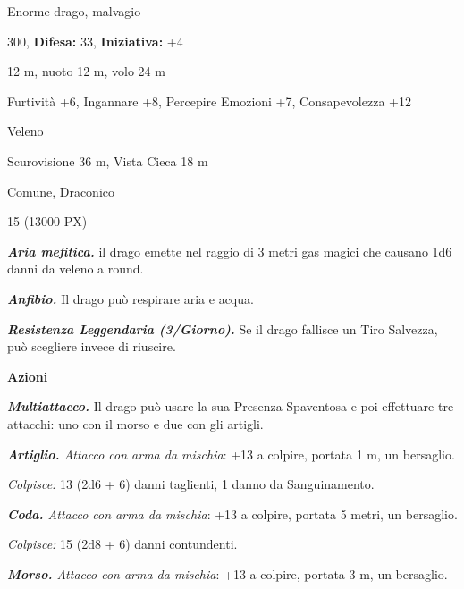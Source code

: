 \begin{multicols}{2}
{
\noindent
\begin{description}[noitemsep, topsep=0pt, parsep=0pt, partopsep=0pt, leftmargin=0cm, labelwidth=2.2cm]
	\item[\textbf{Taglia/Tipo:}] Enorme drago, malvagio
	\item[\textbf{Caratt.:}] 
	\item[\textbf{Punti Ferita:}] 300,  \textbf{Difesa:} 33,  \textbf{Iniziativa:} +4
	\item[\textbf{Movimento:}] 12 m, nuoto 12 m, volo 24 m
	\item[\textbf{Tiri Salvez.:}] 
	\item[\textbf{Comp.:}] Furtività +6, Ingannare +8, Percepire Emozioni +7, Consapevolezza +12
	\item[\textbf{Imm. Danni:}] Veleno
	\item[\textbf{Sensi:}] Scurovisione 36 m, Vista Cieca 18 m
	\item[\textbf{Linguaggi:}] Comune, Draconico
	\item[\textbf{Sfida:}] 15 (13000 PX)\smallskip
\end{description}

\emph{\textbf{Aria mefitica.}} il drago emette nel raggio di 3 metri gas magici che causano 1d6 danni da veleno a round.

\emph{\textbf{Anfibio.}} Il drago può respirare aria e acqua.

\emph{\textbf{Resistenza Leggendaria (3/Giorno).}} Se il drago fallisce un Tiro Salvezza, può scegliere invece di riuscire.

\textbf{Azioni}

\emph{\textbf{Multiattacco.}} Il drago può usare la sua Presenza Spaventosa e poi effettuare tre attacchi: uno con il morso e due con gli artigli.

\emph{\textbf{Artiglio.} Attacco con arma da mischia}: +13 a colpire, portata 1 m, un bersaglio.

\emph{Colpisce:} 13 (2d6 + 6) danni taglienti, 1 danno da Sanguinamento.

\emph{\textbf{Coda.} Attacco con arma da mischia}: +13 a colpire, portata 5 metri, un bersaglio.

\emph{Colpisce:} 15 (2d8 + 6) danni contundenti.

\emph{\textbf{Morso.} Attacco con arma da mischia}: +13 a colpire, portata 3 m, un bersaglio.

}
\end{multicols}
